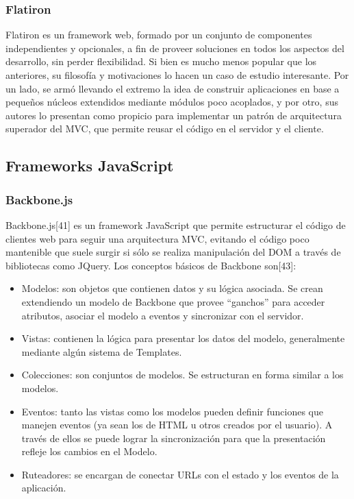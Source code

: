 \documentclass[doc,helv,longtable]{article}
\begin{document}
\subsubsection{Flatiron}
Flatiron\cite{flatiron} es un framework web, formado por un conjunto de componentes independientes y opcionales, a fin de proveer soluciones en todos los aspectos del desarrollo, sin perder flexibilidad\cite{flatironintro}. Si bien es mucho menos popular que los anteriores, su filosofía y motivaciones lo hacen un caso de estudio interesante. Por un lado, se armó llevando el extremo la idea de construir aplicaciones en base a pequeños núcleos extendidos mediante módulos poco acoplados\cite{nodephilosophy}, y por otro, sus autores lo presentan como propicio para implementar un patrón de arquitectura superador del MVC, que permite reusar el código en el servidor y el cliente\cite{isomorphic}. 

\subsection{Frameworks JavaScript}
\subsubsection{Backbone.js}
Backbone.js[41] es un framework JavaScript que permite estructurar el código de clientes web para seguir una arquitectura MVC, evitando el código poco mantenible que suele surgir si sólo se realiza manipulación del DOM a través de bibliotecas como JQuery. Los conceptos básicos de Backbone son[43]:
\begin{itemize}
\item  Modelos: son objetos que contienen datos y su lógica asociada. Se crean extendiendo un modelo de Backbone que provee “ganchos” para acceder atributos, asociar el modelo a eventos y sincronizar con el servidor.
\item  Vistas: contienen la lógica para presentar los datos del modelo, generalmente mediante algún sistema de Templates.
\item  Colecciones: son conjuntos de modelos. Se estructuran en forma similar a los modelos.
\item  Eventos: tanto las vistas como los modelos pueden definir funciones que manejen eventos (ya sean los de HTML u otros creados por el usuario). A través de ellos se puede lograr la sincronización para que la presentación refleje los cambios en el Modelo.
\item  Ruteadores: se encargan de conectar URLs con el estado y los eventos de la aplicación.

\end{itemize}
\end{document}
